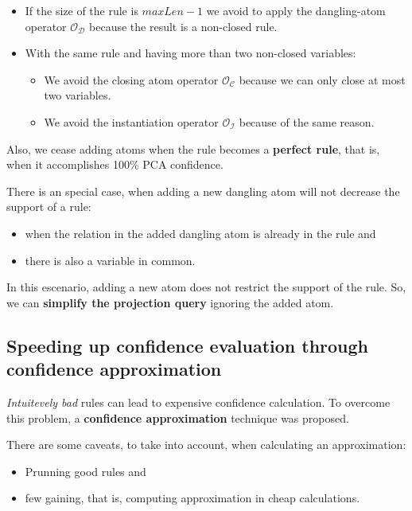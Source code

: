 \documentclass{article}
\begin{document}
\begin{itemize}
    \item If the size of the rule is \textbf{$maxLen -1$} we avoid to apply the
        dangling-atom operator $\mathcal{O}_\mathcal{D}$ because the result is a
        non-closed rule.
    \item With the same rule and having more than two non-closed variables:
        \begin{itemize}
            \item We avoid the closing atom operator $\mathcal{O}_\mathcal{C}$
                because we can only close at most two variables.
            \item We avoid the instantiation operator $\mathcal{O}_\mathcal{I}$
                because of the same reason.
        \end{itemize}
\end{itemize}

Also, we cease adding atoms when the rule becomes a \textbf{perfect rule}, that
is, when it accomplishes 100\% PCA confidence.

There is an special case, when adding a new dangling atom will not decrease the
support of a rule:

\begin{itemize}
    \item when the relation in the added dangling atom is already in the rule and
    \item there is also a variable in common.
\end{itemize}

In this escenario, adding a new atom does not restrict the support of the rule.
So, we can \textbf{simplify the projection query} ignoring the added atom.

\subsection{Speeding up confidence evaluation through confidence approximation}

\textit{Intuitevely bad} rules can lead to expensive confidence calculation. To
overcome this problem, a \textbf{confidence approximation} technique was
proposed.

There are some caveats, to take into account, when calculating an approximation:

\begin{itemize}
    \item Prunning good rules and
    \item few gaining, that is, computing approximation in cheap calculations.
\end{itemize}
\end{document}
